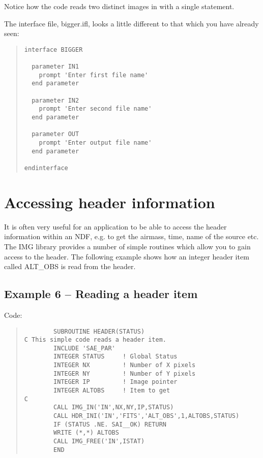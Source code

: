 Notice how the code reads two distinct images in with a single statement.

The interface file, {\sf bigger.ifl}, looks a little different to that 
which you have already seen:

\begin{quote}
{\small
\begin{verbatim}
interface BIGGER

  parameter IN1
    prompt 'Enter first file name'
  end parameter

  parameter IN2
    prompt 'Enter second file name'
  end parameter

  parameter OUT
    prompt 'Enter output file name'
  end parameter

endinterface
\end{verbatim}
}
\end{quote}

\section{Accessing header information}

It is often very useful for an application to be able to access the header
information within an NDF, e.g. to get the airmass, time, name of the
source etc. The IMG library provides a number of simple routines which
allow you to gain access to the header. The following example shows how an
integer header item called {\sf ALT\_OBS} is read from the header. 

\subsection{Example 6 -- Reading a header item}

Code:

 \begin{quote}
{\small
\begin{verbatim}
        SUBROUTINE HEADER(STATUS)
C This simple code reads a header item.
        INCLUDE 'SAE_PAR'
        INTEGER STATUS     ! Global Status
        INTEGER NX         ! Number of X pixels
        INTEGER NY         ! Number of Y pixels
        INTEGER IP         ! Image pointer
        INTEGER ALTOBS     ! Item to get 
C
        CALL IMG_IN('IN',NX,NY,IP,STATUS)
        CALL HDR_INI('IN','FITS','ALT_OBS',1,ALTOBS,STATUS)
        IF (STATUS .NE. SAI__OK) RETURN
        WRITE (*,*) ALTOBS
        CALL IMG_FREE('IN',ISTAT)
        END
\end{verbatim}
}
\end{quote}

